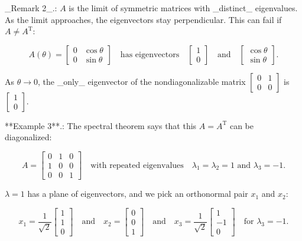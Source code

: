 _Remark 2_.: \(A\) is the limit of symmetric matrices with _distinct_ eigenvalues. As the limit approaches, the eigenvectors stay perpendicular. This can fail if \(A\neq A^{\mathrm{T}}\):

\[A(\theta)=\begin{bmatrix}0&\cos\theta\\ 0&\sin\theta\end{bmatrix}\quad\text{has eigenvectors}\quad\begin{bmatrix}1\\ 0\end{bmatrix}\quad\text{and}\quad\begin{bmatrix}\cos\theta\\ \sin\theta\end{bmatrix}.\]

As \(\theta\to 0\), the _only_ eigenvector of the nondiagonalizable matrix \(\begin{bmatrix}0&1\\ 0&0\end{bmatrix}\) is \(\begin{bmatrix}1\\ 0\end{bmatrix}\).

**Example 3**.: The spectral theorem says that this \(A=A^{\mathrm{T}}\) can be diagonalized:

\[A=\begin{bmatrix}0&1&0\\ 1&0&0\\ 0&0&1\end{bmatrix}\quad\text{with repeated eigenvalues}\quad\lambda_{1}= \lambda_{2}=1\text{ and }\lambda_{3}=-1.\]

\(\lambda=1\) has a plane of eigenvectors, and we pick an orthonormal pair \(x_{1}\) and \(x_{2}\):

\[x_{1}=\frac{1}{\sqrt{2}}\begin{bmatrix}1\\ 1\\ 0\end{bmatrix}\quad\text{and}\quad x_{2}=\begin{bmatrix}0\\ 0\\ 1\end{bmatrix}\quad\text{and}\quad x_{3}=\frac{1}{\sqrt{2}}\begin{bmatrix}1\\ -1\\ 0\end{bmatrix}\quad\text{for }\lambda_{3}=-1.\]

